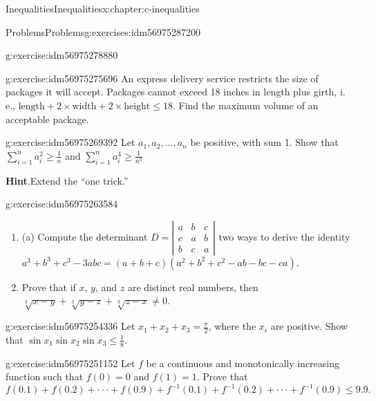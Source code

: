 \documentclass[twoside,10pt,]{book}
\newcommand{\blocktitlefont}{\relax}
\numberwithin{equation}{section}
\begin{document}
\begin{chapterptx}{Inequalities}{}{Inequalities}{}{}{x:chapter:c-inequalities}
\begin{exercises-section}{Problems}{}{Problems}{}{}{g:exercises:idm56975287200}
\begin{divisionexercise}{3}{}{}{g:exercise:idm56975278880}
\end{divisionexercise}%
\begin{divisionexercise}{4}{}{}{g:exercise:idm56975275696}%
An express delivery service restricts the size of packages it will accept.  Packages cannot exceed 18 inches in length plus girth, i. e., \(\text{length}+2\times\text{width} +2\times \text{height}\leq 18\).  Find the maximum volume of an acceptable package.%
\end{divisionexercise}%
\begin{divisionexercise}{5}{}{}{g:exercise:idm56975269392}%
Let \(a_1, a_2, \ldots, a_{n }\) be positive, with sum 1.    Show that \(\sum _{i=1}^n a_i^2\geq \frac{1}{n}\)  and   \(\sum _{i=1}^n
a_i^4\geq \frac{1}{n^3}\)%
\par\smallskip%
\noindent\textbf{\blocktitlefont Hint}.\hypertarget{g:hint:idm56975267088}{}\quad{}Extend the ``one trick.''%
\end{divisionexercise}%
\begin{divisionexercise}{6}{}{}{g:exercise:idm56975263584}%
%
\begin{enumerate}[label=(\alph*)]
\item{}(a)  Compute the determinant \(D= \left| 
\begin{array}{ccc}
a & b & c \\
c & a & b \\
b & c & a 
\end{array} \right|\) two ways to derive the identity \(a^3+b^3+c^3-3 a b c =(a+b+c) \left(a^2+b^2+c^2-a b-b c - c a\right)\).%
\item{}Prove that if \(x\), \(y\), and \(z\) are distinct real numbers, then \(\sqrt[3]{x-y}+ \sqrt[3]{y-z}+\sqrt[3]{z-x}\neq 0\).%
\end{enumerate}
\end{divisionexercise}%
\begin{divisionexercise}{7}{}{}{g:exercise:idm56975254336}%
Let \(x_1+x_2+x_3=\frac{\pi }{2}\), where the \(x_i\) are positive.   Show that  \(\sin  x_1\sin  x_2 \sin  x_3\leq \frac{1}{8}\).%
\end{divisionexercise}%
\begin{divisionexercise}{8}{}{}{g:exercise:idm56975251152}%
Let \(f\) be a continuous and monotonically increasing function such that \(f(0) = 0\) and \(f(1) = 1\). Prove that%
\begin{equation*}
f(0.1)+f(0.2)+\cdot  \cdot  \cdot +f(0.9)+f^{-1}(0.1)+f^{-1}(0.2)+\cdot  \cdot  \cdot +f^{-1}(0.9) \leq  9.9\text{.}
\end{equation*}

\end{divisionexercise}
\end{exercises-section}
\end{chapterptx}
\end{document}
